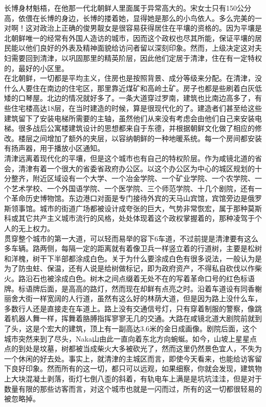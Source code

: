 \begin{multicols}{\theparacolNo}
长博身材魁梧，在他那一代北朝鲜人里面属于异常高大的。宋女士只有150公分高，依偎在长博的身边，长博的搂着她，显得她是那么的小鸟依人。多么完美的一对啊！这对政治上正确的俊男靓女是很容易获得居住在平壤的资格的。因为平壤是北朝鲜唯一的经常有外国人造访的城市，因而这个政权也尽其所能，保证平壤的居民能以他们良好的外表及精神面貌给访问者留以深刻印象。然而，上级决定这对夫妇需要回到清津，以巩固那里的精英阶层，因此他们定居于清津，住在有一定特权的，最好的小区里。\\

在北朝鲜，一切都是平均主义，住房也是按照背景、成分等级来分配。在清津，没什么人要住在南边的住宅区，那里靠近煤矿和高岭土矿。房子也都是些刷着白灰低矮的口琴屋。北边的情况就好多了。一条大道穿过罗南，建筑也比南边高多了，有些住宅楼高达18层，在当时建造的时候，算是很现代化的了。建造者们甚至给这些建筑留下了安装电梯所需要的主轴，虽然他们从来没有考虑会由他们自己来安装电梯。很多战后公寓楼建筑设计的思想都来自于东德，并根据朝鲜文化做了相应的修改。楼层之间增加了额外的夹层，以容纳朝鲜的一种地暖系统。每一个房间都安装有扬声器，用于播放小区通知。\\

清津远离着现代化的平壤，但是这个城市也有自己的特权阶层。作为咸镜北道的省会，清津有着一个很大的省委省政府办公区。以这个办公区为中心的城区规划的十分整齐，附近区域设有一个大学、一个冶金学院、一个矿业学院、一个农学院、一个艺术学校、一个外国语学院、一个医学院、三个师范学院、十几个剧院，还有一个革命历史博物馆。东边港口对面是专门接待外宾的天马山宾馆，宾馆旁边是俄罗斯领事馆。城市的街道广场都被设计成夸张的巨大，气势非常恢宏，属于那种莫斯科或其它共产主义城市流行的风格，处处体现着这个政权掌握着的，那种凌驾于个人的无上权力。\\

贯穿整个城市的第一大道，可以轻而易举的容下6车道，不过前提是清津要有这么多车辆。路两侧，每隔一定的距离就有着像卫兵一样竖立着的行道树，主要是松树和洋槐，树干下半部都涂成白色。关于为什么要涂成白色有很多说法，一般认为是为了防虫蛀、保温，还有人说是给树做标记，即为政府资产，不得私自砍伐以作柴火。路沿石也被涂成白色。树木之间点缀着无处不在的写着革命口号的红色标语牌。标语牌后面，是高高的路灯，然而现在却鲜有点亮之时。沿着车道设有同香榭丽舍大街一样宽阔的人行道，虽然有这么好的林荫大道，但是因为路上没什么车，多数行人还是直接走在车道上。路上没有交通信号灯，只有穿着制服的警察，像跳着机器人舞一样，挥舞着胳膊指挥寥寥无几的交通。大路在咸镜北道大剧院前就到了头，这是个宏大的建筑，顶上有一副高达3.6米的金日成画像。剧院后面，这个城市突然来到了尽头，Naka山由此一直向着东北方向蜿蜒。如今，山坡上星星点点的到处是坟墓，树都被当成柴火大多被砍光了，然而这里仍然景色宜人，不失为一个休闲的好去处。事实上，就清津的主城区而言，即使今天看来，也能给访客留下良好印象。然而所有的这一切，都只可以远观，如果细察，你就会发现，建筑物上大块混凝土剥落，街灯七倒八歪的斜着，有轨电车上满是是坑坑洼洼，但是对于数量有限的那些访客而言，对这个城市也就是一闪而过，所有的这一切都很轻易的被忽略掉。\\


\end{multicols}
